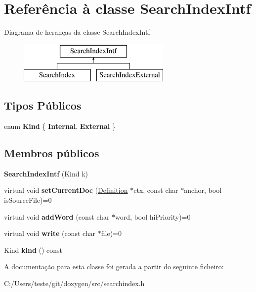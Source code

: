 \hypertarget{class_search_index_intf}{\section{Referência à classe Search\-Index\-Intf}
\label{class_search_index_intf}
}
Diagrama de heranças da classe Search\-Index\-Intf\begin{figure}[H]
\begin{center}
\leavevmode
\includegraphics[height=2.000000cm]{class_search_index_intf}
\end{center}
\end{figure}
\subsection*{Tipos Públicos}
\begin{DoxyCompactItemize}
\item 
enum {\bfseries Kind} \{ {\bfseries Internal}, 
{\bfseries External}
 \}
\end{DoxyCompactItemize}
\subsection*{Membros públicos}
\begin{DoxyCompactItemize}
\item 
\hypertarget{class_search_index_intf_a0a73bedec6314b4ca2dde854f780ff21}{{\bfseries Search\-Index\-Intf} (Kind k)}\label{class_search_index_intf_a0a73bedec6314b4ca2dde854f780ff21}

\item 
\hypertarget{class_search_index_intf_a0f3be404ab4968da6f5545669c569d3f}{virtual void {\bfseries set\-Current\-Doc} (\hyperlink{class_definition}{Definition} $\ast$ctx, const char $\ast$anchor, bool is\-Source\-File)=0}\label{class_search_index_intf_a0f3be404ab4968da6f5545669c569d3f}

\item 
\hypertarget{class_search_index_intf_a323777067b6847c3e2fa3ab8cd5ed3bc}{virtual void {\bfseries add\-Word} (const char $\ast$word, bool hi\-Priority)=0}\label{class_search_index_intf_a323777067b6847c3e2fa3ab8cd5ed3bc}

\item 
\hypertarget{class_search_index_intf_a7f27b24b673da9d30a632007a0ffe6cc}{virtual void {\bfseries write} (const char $\ast$file)=0}\label{class_search_index_intf_a7f27b24b673da9d30a632007a0ffe6cc}

\item 
\hypertarget{class_search_index_intf_aa9d037bed9f9a083d0cd01485637d843}{Kind {\bfseries kind} () const }\label{class_search_index_intf_aa9d037bed9f9a083d0cd01485637d843}

\end{DoxyCompactItemize}


A documentação para esta classe foi gerada a partir do seguinte ficheiro\-:\begin{DoxyCompactItemize}
\item 
C\-:/\-Users/teste/git/doxygen/src/searchindex.\-h\end{DoxyCompactItemize}
